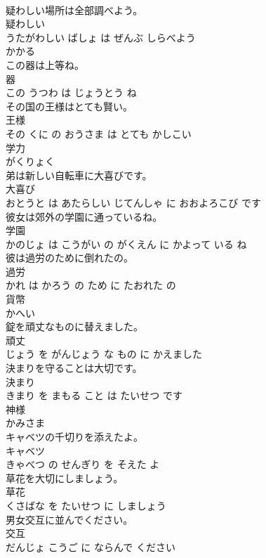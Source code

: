 \documentclass[8pt]{extreport}
\begin{document}
\begin{CJK}{UTF8}{min}
\\	疑わしい場所は全部調べよう。	
\\	疑わしい 
\\	うたがわしい ばしょ は ぜんぶ しらべよう			
\\	かかる	
\\	この器は上等ね。	
\\	器 
\\	この うつわ は じょうとう ね			
\\	その国の王様はとても賢い。	
\\	王様 
\\	その くに の おうさま は とても かしこい			
\\	学力	
\\	がくりょく		
\\	弟は新しい自転車に大喜びです。	
\\	大喜び 
\\	おとうと は あたらしい じてんしゃ に おおよろこび です			
\\	彼女は郊外の学園に通っているね。	
\\	学園 
\\	かのじょ は こうがい の がくえん に かよって いる ね			
\\	彼は過労のために倒れたの。	
\\	過労 
\\	かれ は かろう の ため に たおれた の			
\\	貨幣	
\\	かへい		
\\	錠を頑丈なものに替えました。	
\\	頑丈 
\\	じょう を がんじょう な もの に かえました			
\\	決まりを守ることは大切です。	
\\	決まり 
\\	きまり を まもる こと は たいせつ です			
\\	神様	
\\	かみさま		
\\	キャベツの千切りを添えたよ。	
\\	キャベツ 
\\	きゃべつ の せんぎり を そえた よ			
\\	草花を大切にしましょう。	
\\	草花 
\\	くさばな を たいせつ に しましょう			
\\	男女交互に並んでください。	
\\	交互 
\\	だんじょ こうご に ならんで ください			

\end{CJK}
\end{document}
